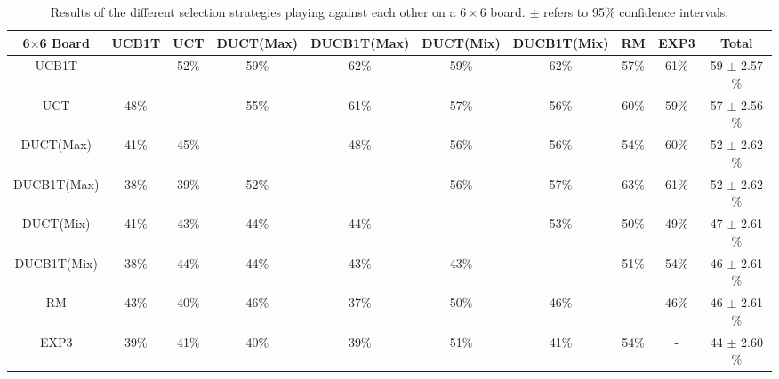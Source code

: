 \documentclass{article}
\begin{document}
\begin{table}[h!]\scriptsize
\centering
\begin{tabular}{|c||c|c|c|c|c|c|c|c|c|}
									\hline
	6$\times$6 Board	& UCB1T 	& UCT		& DUCT(Max)	& DUCB1T(Max)	& DUCT(Mix)	& DUCB1T(Mix)	& RM	& EXP3	& Total			\\ \hline
	UCB1T							& -				& 52\%	& 59\%			& 62\%				& 59\%			& 62\%				& 57\%& 61\%	& 59 $\pm$ 2.57 \%		\\ \hline
	UCT								& 48\%		& -			& 55\%			& 61\%				& 57\%			& 56\%				& 60\%& 59\%	& 57 $\pm$ 2.56 \%		\\ \hline
	DUCT(Max)					& 41\%		& 45\%	& -					& 48\%				& 56\%			& 56\%				& 54\%& 60\%	& 52 $\pm$ 2.62 \%		\\ \hline
	DUCB1T(Max)				& 38\%		& 39\%	& 52\%			& -						& 56\%			& 57\%				& 63\%& 61\%	& 52 $\pm$ 2.62 \%		\\ \hline
	DUCT(Mix)					& 41\%		& 43\%	& 44\%			& 44\%				& -					& 53\%				& 50\%& 49\%	& 47 $\pm$ 2.61 \%		\\ \hline
	DUCB1T(Mix)				& 38\%		& 44\%	& 44\%			& 43\%				& 43\%			& -						& 51\%& 54\%	& 46 $\pm$ 2.61 \%		\\ \hline
	RM								& 43\%		& 40\%	& 46\%			& 37\%				& 50\%			& 46\%				& -		& 46\%	& 46 $\pm$ 2.61 \%		\\ \hline
	EXP3							& 39\%		& 41\%	& 40\%			& 39\%				& 51\%			& 41\%				& 54\%& -			& 44 $\pm$ 2.60 \%		\\ \hline
\end{tabular}
\caption{Results of the different selection strategies playing against each other on a $6\times6$ board. $\pm$ refers to 95\% confidence intervals.}
\label{table:rr_small}
\end{table}


\end{document}
